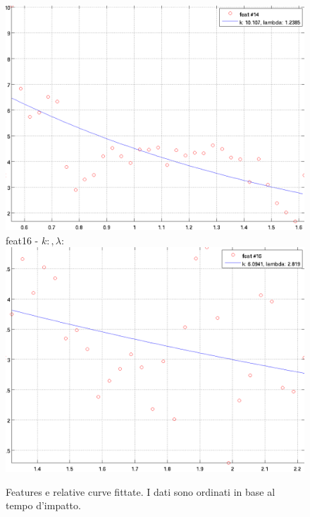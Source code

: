 \documentclass[12pt]{report}
\begin{document}
\begin{figure}[H]
\begin{minipage}[t]{0.5\linewidth}
	\includegraphics[scale=\imFeat]{images/feat14}\\
	feat16 - $k: , \lambda:  $\\
	\includegraphics[scale=\imFeat]{images/feat16}\\
\end{minipage}
\caption[short]{Features e relative curve fittate. I dati sono ordinati in base al tempo d'impatto.}
\label{fig:feats3}
\end{figure}
\end{document}
